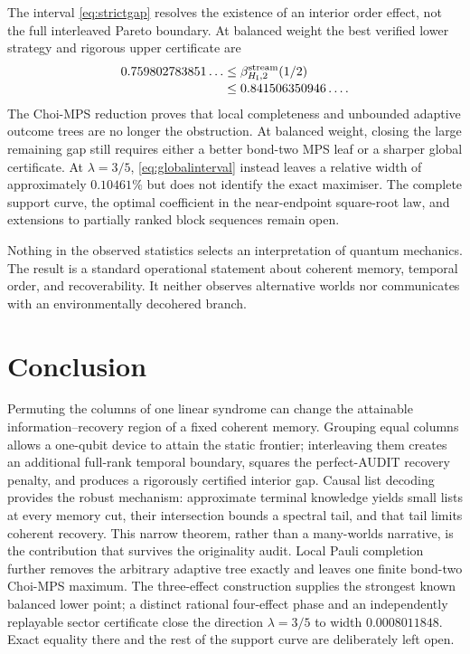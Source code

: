\documentclass[10pt,twocolumn]{article}
\theoremstyle{remark}
\begin{document}
The interval \eqref{eq:strictgap} resolves the existence of an interior order
effect, not the full interleaved Pareto boundary. At balanced weight the best
verified lower strategy and rigorous upper certificate are
\begin{align}
0.759802783851\ldots
&\leq\beta^{\rm stream}_{H_{\rm I},2}(1/2)\notag\\[-1mm]
&\leq0.841506350946\ldots.
\end{align}
The Choi-MPS reduction proves that local completeness and unbounded adaptive
outcome trees are no longer the obstruction. At balanced weight, closing the
large remaining gap still requires either a better bond-two MPS leaf or a
sharper global certificate. At $\lambda=3/5$, \cref{eq:globalinterval}
instead leaves a relative width of approximately $0.10461\%$ but does not
identify the exact maximiser. The complete support curve, the optimal
coefficient in the near-endpoint square-root law, and extensions to partially
ranked block sequences remain open.

Nothing in the observed statistics selects an interpretation of quantum
mechanics. The result is a standard operational statement about coherent
memory, temporal order, and recoverability. It neither observes alternative
worlds nor communicates with an environmentally decohered branch.

\section{Conclusion}

Permuting the columns of one linear syndrome can change the attainable
information--recovery region of a fixed coherent memory. Grouping equal
columns allows a one-qubit device to attain the static frontier; interleaving
them creates an additional full-rank temporal boundary, squares the
perfect-AUDIT recovery penalty, and produces a rigorously certified interior
gap. Causal list decoding provides the robust mechanism: approximate terminal
knowledge yields small lists at every memory cut, their intersection bounds a
spectral tail, and that tail limits coherent recovery. This narrow theorem,
rather than a many-worlds narrative, is the contribution that survives the
originality audit. Local Pauli completion further removes the arbitrary
adaptive tree exactly and leaves one finite bond-two Choi-MPS maximum. The
three-effect construction supplies the strongest known balanced lower point;
a distinct rational four-effect phase and an independently replayable sector
certificate close the direction $\lambda=3/5$ to width $0.0008011848$. Exact
equality there and the rest of the support curve are deliberately left open.
\end{document}

